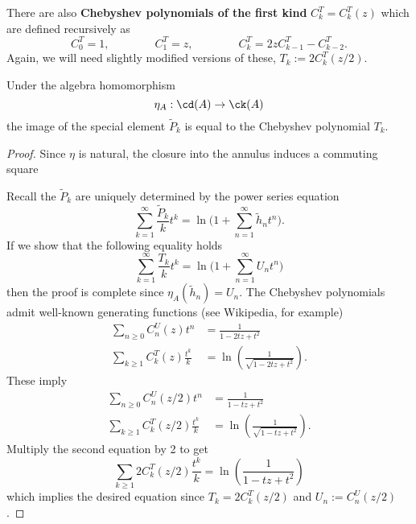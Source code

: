 There are also \textbf{Chebyshev polynomials of the first kind} $C^T_k = C^T_k(z)$ which are defined recursively as
\[
C^T_0 = 1, \qquad \qquad C^T_1 = z, \qquad \qquad C^T_k = 2 z C^T_{k-1} - C^T_{k-2}.
\]
Again, we will need slightly modified versions of these, $T_k := 2C^T_k(z/2)$.  

\begin{corollary}
Under the algebra homomorphism
\[
\eta_A: \cd(A) \to \ck(A)
\]
the image of the special element $\tilde{P}_k$ is equal to the Chebyshev polynomial $T_k$.
\end{corollary}
\begin{proof}
Since $\eta$ is natural, the closure into the annulus induces a commuting square
\begin{center}
\end{center}
Recall the $\tilde{P}_k$ are uniquely determined by the power series equation
\[
\sum_{k=1}^\infty \frac{\tilde{P}_k}{k} t^k = \ln \Bigg( 1 + \sum_{n=1}^\infty \tilde{h}_n t^n \Bigg).
\]
If we show that the following equality holds
\[
\sum_{k=1}^\infty \frac{T_k}{k} t^k = \ln \Bigg( 1 + \sum_{n=1}^\infty U_n t^n \Bigg)
\]
then the proof is complete since $\eta_A(\tilde{h}_n)=U_n$. The Chebyshev polynomials admit well-known generating functions (see Wikipedia, for example)
\begin{align*}
\sum_{n \geq 0} C_n^U(z)t^n &= \frac{1}{1-2tz+t^2} \\
\sum_{k \geq 1} C_k^T(z)\frac{t^k}{k} &= \ln \left( \frac{1}{\sqrt{1-2tz+t^2}} \right).
\end{align*}
These imply
\begin{align*}
\sum_{n \geq 0} C_n^U(z/2)t^n &= \frac{1}{1-tz+t^2} \\
\sum_{k \geq 1} C_k^T(z/2)\frac{t^k}{k} &= \ln \left( \frac{1}{\sqrt{1-tz+t^2}} \right).
\end{align*}
Multiply the second equation by 2 to get
\[
\sum_{k \geq 1} 2C_k^T(z/2)\frac{t^k}{k} = \ln \left( \frac{1}{1-tz+t^2} \right)
\]
which implies the desired equation since $T_k = 2C_k^T(z/2)$ and $U_n := C_n^U(z/2)$.
\end{proof}

